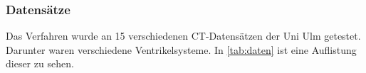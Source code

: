 \subsubsection{Datensätze}

Das Verfahren wurde an 15 verschiedenen CT-Datensätzen der Uni Ulm getestet. Darunter waren verschiedene Ventrikelsysteme. In \autoref{tab:daten} ist eine Auflistung dieser zu sehen.

\begin{table}[H]
\centering
{}
\caption{Verwendeten Datensätze}
\label{tab:daten}
\end{table}



